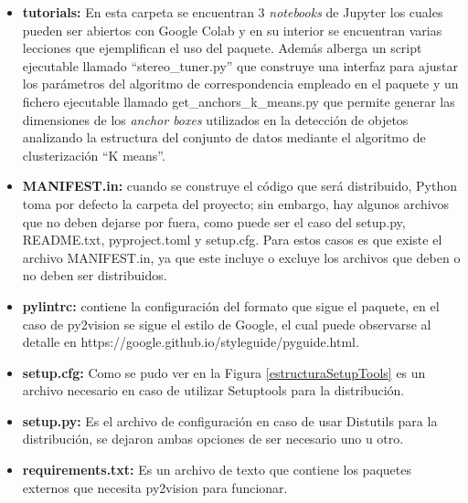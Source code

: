 \begin{itemize}
   \item \textbf{tutorials:} En esta carpeta se encuentran 3 \textit{notebooks} de Jupyter los cuales pueden ser abiertos con Google Colab y en su interior se encuentran varias lecciones que ejemplifican el uso del paquete. Además alberga un script ejecutable llamado ``stereo\_tuner.py'' que construye una interfaz para ajustar los parámetros del algoritmo de correspondencia empleado en el paquete y un fichero ejecutable llamado get\_anchors\_k\_means.py que permite generar las dimensiones de los \textit{anchor boxes} utilizados en la detección de objetos analizando la estructura del conjunto de datos mediante el algoritmo de clusterización ``K means''.
    \item \textbf{MANIFEST.in:} cuando se construye el código que será distribuido, Python toma por defecto la carpeta del proyecto; sin embargo, hay algunos archivos que no deben dejarse por fuera, como puede ser el caso del setup.py, README.txt, pyproject.toml y setup.cfg. Para estos casos es que existe el archivo MANIFEST.in, ya que este incluye o excluye los archivos que deben o no deben ser distribuidos.
    \item \textbf{pylintrc:} contiene la configuración del formato que sigue el paquete, en el caso de py2vision se sigue el estilo de Google, el cual puede observarse al detalle en https://google.github.io/styleguide/pyguide.html.
    \item \textbf{setup.cfg:} Como se pudo ver en la Figura \ref{estructuraSetupTools} es un archivo necesario en caso de utilizar Setuptools para la distribución.
    \item \textbf{setup.py:} Es el archivo de configuración en caso de usar Distutils para la distribución, se dejaron ambas opciones de ser necesario uno u otro.
    \item \textbf{requirements.txt:} Es un archivo de texto que contiene los paquetes externos que necesita py2vision para funcionar.
\end{itemize}
